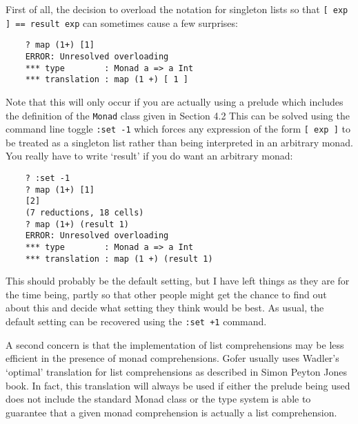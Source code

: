 First of all, the decision to overload the notation for singleton lists
so that \verb"[ exp ] == result exp" can sometimes cause a few surprises:
\begin{verbatim}
    ? map (1+) [1]
    ERROR: Unresolved overloading
    *** type        : Monad a => a Int
    *** translation : map (1 +) [ 1 ]
\end{verbatim}
Note that this will only occur if you are actually using a prelude
which includes the definition of the \verb"Monad" class given in Section 4.2
This can be solved using the command line toggle \verb":set -1" which forces
any expression of the form \verb"[ exp ]" to be treated as a singleton list
rather than being interpreted in an arbitrary monad.  You really
have to write `result' if you do want an arbitrary monad:
\begin{verbatim}
    ? :set -1
    ? map (1+) [1]
    [2]
    (7 reductions, 18 cells)
    ? map (1+) (result 1)
    ERROR: Unresolved overloading
    *** type        : Monad a => a Int
    *** translation : map (1 +) (result 1)
\end{verbatim}
This should probably be the default setting, but I have left things as
they are for the time being, partly so that other people might get the
chance to find out about this and decide what setting they think would
be best.  As usual, the default setting can be recovered using the
\verb":set +1" command.

A second concern is that the implementation of list comprehensions may
be less efficient in the presence of monad comprehensions.  Gofer
usually uses Wadler's `optimal' translation for list comprehensions as
described in Simon Peyton Jones book.  In fact, this translation will
always be used if either the prelude being used does not include the
standard Monad class or the type system is able to guarantee that a
given monad comprehension is actually a list comprehension.

